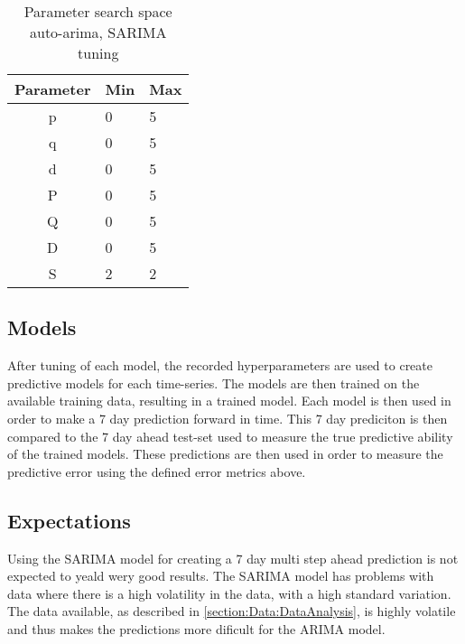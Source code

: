 \begin{table}[h]
  \centering
  \caption{Parameter search space auto-arima, SARIMA tuning}
  \label{table:method:arima-tuning}
  \begin{tabular}{|c|l|l|}\hline
    Parameter & Min & Max   \\ \hline
    p   & 0 & 5 \\ \hline
    q   & 0 & 5 \\ \hline
    d   & 0 & 5 \\ \hline
    P   & 0 & 5 \\ \hline
    Q   & 0 & 5 \\ \hline
    D   & 0 & 5 \\ \hline
    S   & 2 & 2 \\ \hline
  \end{tabular}
\end{table}


\subsection{Models}

After tuning of each model, the recorded hyperparameters are used to create predictive models for each time-series.
The models are then trained on the available training data, resulting in a trained model.
Each model is then used in order to make a 7 day prediction forward in time.
This 7 day prediciton is then compared to the 7 day ahead test-set used to measure the true predictive ability of the trained models. 
These predictions are then used in order to measure the predictive error using the defined error metrics above.


\subsection{Expectations}

Using the SARIMA model for creating a 7 day multi step ahead prediction is not expected to yeald wery good results.
The SARIMA model has problems with data where there is a high volatility in the data, with a high standard variation.
The data available, as described in \cref{section:Data:DataAnalysis},
is highly volatile and thus makes the predictions more dificult for the ARIMA model.




